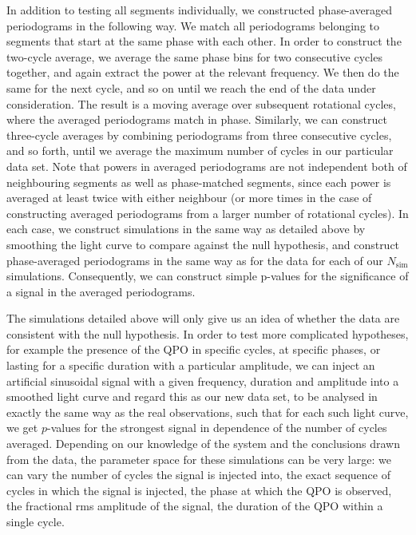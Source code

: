 \documentclass{emulateapj}
\begin{document}
In addition to testing all segments individually, we constructed phase-averaged periodograms in the following way. We match all periodograms belonging to segments that start at the same phase with each other. In order to construct the two-cycle average, we average the same phase bins for two consecutive cycles together, and again extract the power at the relevant frequency. We then do the same for the next cycle, and so on until we reach the end of the data under consideration. The result is a moving average over subsequent rotational cycles, where the averaged periodograms match in phase.
Similarly, we can construct three-cycle averages by combining periodograms from three consecutive cycles, and so forth, until we average the maximum number of cycles in our particular data set.  
Note that powers in averaged periodograms are not independent both of neighbouring segments as well as phase-matched segments, since each power is averaged at least twice with either neighbour (or more times in the case of constructing averaged periodograms from a larger number of rotational cycles). 
In each case, we construct simulations in the same way as detailed above by smoothing the light curve to compare against the null hypothesis, and construct phase-averaged periodograms in the same way as for the data for each of our $N_\mathrm{sim}$ simulations. Consequently, we can construct simple p-values for the significance of a signal in the averaged periodograms. 
 
The simulations detailed above will only give us an idea of whether the data are consistent with the null hypothesis. In order to test more complicated hypotheses, for example the presence of the QPO in specific cycles, at specific phases, or lasting for a specific duration with a particular amplitude, we can inject an artificial sinusoidal signal with a given frequency, duration and amplitude into a smoothed light curve and regard this as our new data set, to be analysed in exactly the same way as the real observations, such that for each such light curve, we get $p$-values for the strongest signal in dependence of the number of cycles averaged. Depending on our knowledge of the system and the conclusions drawn from the data, the parameter space for these simulations can be very large: we can vary the number of cycles the signal is injected into, the exact sequence of cycles in which the signal is injected, the phase at which the QPO is observed, the fractional rms amplitude of the signal, the duration of the QPO within a single cycle.
\end{document}
